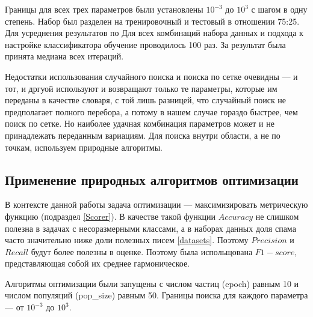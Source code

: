 Границы для всех трех параметров были установлены $10^{-3}$ до $10^3$ с шагом в одну степень.
Набор был разделен на тренировочный и тестовый в отношении 75:25. Для усреднения результатов по
Для всех комбинаций набора данных и подхода к настройке классификатора обучение проводилось 100 раз. 
За результат была принята медиана всех итераций.

Недостатки использования случайного поиска и поиска по сетке очевидны — и тот, и дргуой используют и возвращают только те
параметры, которые им переданы в качестве словаря, с той лишь разницей, что случайный поиск не предполагает полного перебора,
а потому в нашем случае гораздо быстрее, чем поиск по сетке.
Но наиболее удачная комбинация параметров может и не принадлежать переданным вариациям. Для поиска внутри области,
а не по точкам, используем природные алгоритмы.

\subsection{Применение природных алгоритмов оптимизации}

В контексте данной работы задача оптимизации — максимизировать метрическую функцию (подраздел \ref{Scorer}).
В качестве такой функции $Accuracy$ не слишком полезна в задачах с несоразмерными классами, 
а в наборах данных доля спама часто значительно ниже доли полезных писем \ref{datasets}. Поэтому $Precision$ и 
$Recall$ будут более полезны в оценке. Поэтому была испольщована $F1-score$, представляющая собой их среднее гармоническое.

Алгоритмы оптимизации были запущены с числом частиц (epoch) равным 10 и числом популяций (pop\_size) равным 50.
Границы поиска для каждого параметра — от $10^{-3}$ до $10^3$.




